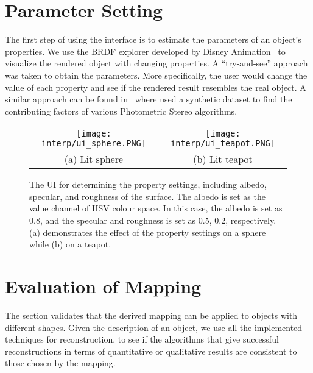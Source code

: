 \section{Parameter Setting}
The first step of using the interface is to estimate the parameters of an object's properties. We use the BRDF explorer developed by Disney Animation~\cite{disnybrdf} to visualize the rendered object with changing properties. A ``try-and-see'' approach was taken to obtain the parameters. More specifically, the user would change the value of each property and see if the rendered result resembles the real object. A similar approach can be found in~\cite{Berkiten:2016:ARB} where \citeauthor{Berkiten:2016:ARB} used a synthetic dataset to find the contributing factors of various Photometric Stereo algorithms.
\begin{figure}[!htbp]
\centering
\begin{tabular}{cc}
  \texttt{[image: interp/ui\_sphere.PNG]}&
  \texttt{[image: interp/ui\_teapot.PNG]}\\
  (a) Lit sphere & (b) Lit teapot\\
\end{tabular}
\caption{The UI for determining the property settings, including albedo, specular, and roughness of the surface. The albedo is set as the value channel of HSV colour space. In this case, the albedo is set as 0.8, and the specular and roughness is set as 0.5, 0.2, respectively. (a) demonstrates the effect of the property settings on a sphere while (b) on a teapot.}
\label{fig:ui}
\end{figure}

\section{Evaluation of Mapping}
\label{sec:eval_mapping}
The section validates that the derived mapping can be applied to objects with different shapes. Given the description of an object, we use all the implemented techniques for reconstruction, to see if the algorithms that give successful reconstructions in terms of quantitative or qualitative results are consistent to those chosen by the mapping.

